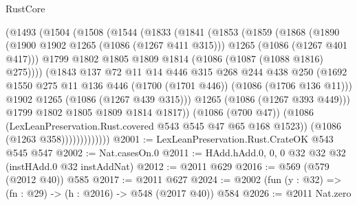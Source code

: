 \begin{lexlean}{RustCore}
\begin{coremodule}
{\begin{coremodule}
{{{{{{                  (@1493
                    (@1504
                      (@1508
                        (@1544
                          (@1833
                            (@1841
                              (@1853
                                (@1859
                                  (@1868
                                    (@1890
                                      (@1900 @1902 @1265 (@1086 (@1267 @411 @315)))
                                      @1265
                                      (@1086 (@1267 @401 @417)))
                                    @1799
                                    @1802
                                    @1805
                                    @1809
                                    @1814
                                    (@1086 (@1087 (@1088 @1816) @275))))
                                (@1843
                                  @137
                                  @72
                                  @11
                                  @14
                                  @446
                                  @315
                                  @268
                                  @244
                                  @438
                                  @250
                                  (@1692
                                    @1550
                                    @275
                                    @11
                                    @136
                                    @446
                                    (@1700 (@1701 @446))
                                    (@1086 (@1706 @136 @11)))
                                  @1902
                                  @1265
                                  (@1086 (@1267 @439 @315)))
                                @1265
                                (@1086 (@1267 @393 @449)))
                              @1799
                              @1802
                              @1805
                              @1809
                              @1814
                              @1817))
                          (@1086 (@700 @47))
                          (@1086 (LexLeanPreservation.Rust.covered @543 @545 @47 @65 @168 @1523))
                          (@1086 (@1263 @358)))))))))))))
@2001 := LexLeanPreservation.Rust.CrateOK @543 @545 @547
@2002 := Nat.casesOn.{0}
@2011 := HAdd.hAdd.{0, 0, 0} @32 @32 @32 (instHAdd.{0} @32 instAddNat)
@2012 := @2011 @629
@2016 := @569 (@579 (@2012 @40)) @585
@2017 := @2011 @627
@2024 := @2002 (fun (y : @32) => (fn : @29) -> (h : @2016) -> @548 (@2017 @40)) @584
@2026 := @2011 Nat.zero
}}}}}}
\end{coremodule}}
\end{coremodule}
\end{lexlean}
